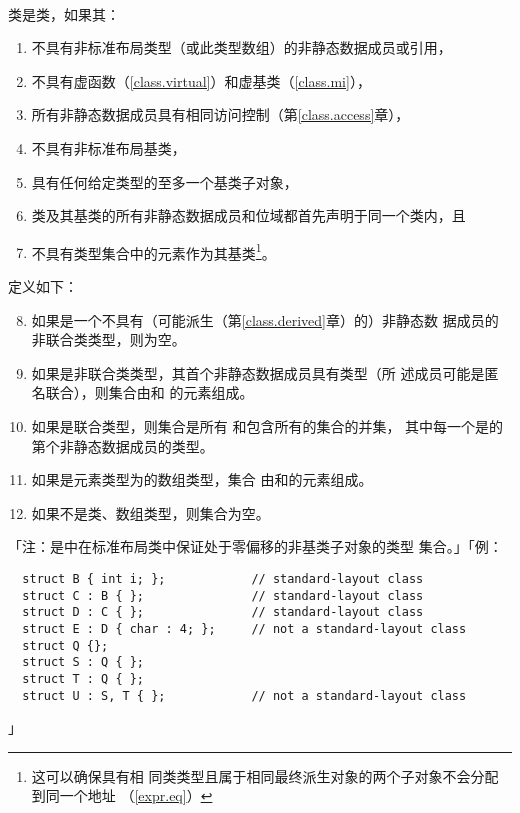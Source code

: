 \paragraph{}
类是类，如果其：
\begin{enumerate}
  \item{不具有非标准布局类型（或此类型数组）的非静态数据成员或引用，}
  \item{不具有虚函数（\ref{class.virtual}）和虚基类（\ref{class.mi}），}
  \item{所有非静态数据成员具有相同访问控制（第\ref{class.access}章），}
  \item{不具有非标准布局基类，}
  \item{具有任何给定类型的至多一个基类子对象，}
  \item{类及其基类的所有非静态数据成员和位域都首先声明于同一个类内，且}
  \item{不具有类型集合中的元素作为其基类\footnote{这可以确保具有相
    同类类型且属于相同最终派生对象的两个子对象不会分配到同一个地址
    （\ref{expr.eq}）}。}
\end{enumerate}
定义如下：
\begin{enumerate}
  \setcounter{enumi}{7}
  \item{如果是一个不具有（可能派生（第\ref{class.derived}章）的）非静态数
    据成员的非联合类类型，则为空。}
  \item{如果是非联合类类型，其首个非静态数据成员具有类型（所
    述成员可能是匿名联合），则集合由和
    的元素组成。}
  \item{如果是联合类型，则集合是所有
    \tm{)}和包含所有的集合的并集，
    其中每一个是的第个非静态数据成员的类型。}
  \item{如果是元素类型为的数组类型，集合
    由和的元素组成。}
  \item{如果不是类、数组类型，则集合为空。}
\end{enumerate}
「注：是中在标准布局类中保证处于零偏移的非基类子对象的类型
集合。」「例：
\begin{lstlisting}
  struct B { int i; };            // standard-layout class
  struct C : B { };               // standard-layout class
  struct D : C { };               // standard-layout class
  struct E : D { char : 4; };     // not a standard-layout class
  struct Q {};
  struct S : Q { };
  struct T : Q { };
  struct U : S, T { };            // not a standard-layout class
\end{lstlisting}」

